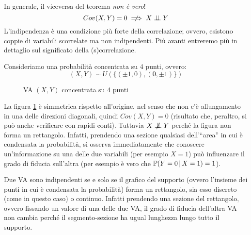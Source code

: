 \medskip
\begin{nb}
  In generale, il viceversa del teorema \emph{non è vero}!
  $$Cov(X,Y) = 0 \centernot\implies X \indep Y$$
  L'indipendenza è una condizione più forte della correlazione; ovvero, esistono coppie di variabili scorrelate ma non indipendenti. Più avanti entreremo più in dettaglio sul significato della (s)correlazione.
\end{nb}

\medskip
\begin{ese}
  Consideriamo una probabilità concentrata su 4 punti, ovvero:
  $$(X,Y) \sim U( \{ (\pm 1, 0), (0, \pm 1) \} )$$

  \begin{figure}[ht]
    \centering
    \caption{VA $(X,Y)$ concentrata su 4 punti}\label{fig-prob-concentrata}
  \end{figure}

  La figura \ref{fig-prob-concentrata} è simmetrica rispetto all'origine, nel senso che non c'è allungamento in una delle direzioni diagonali, quindi $Cov(X,Y) = 0$ (risultato che, peraltro, si può anche verificare con rapidi conti).
  Tuttavia $X \centernot\indep Y$ perché la figura non forma un rettangolo. Infatti, prendendo una sezione qualsiasi dell'``area'' in cui è condensata la probabilità, si osserva immediatamente che conoscere un'informazione su una delle due variabili (per esempio $X=1$) può influenzare il grado di fiducia sull'altra (per esempio è vero che $\mathbb P(Y = 0 \, | \, X = 1) = 1$).

  Due VA sono indipendenti se e solo se il grafico del supporto (ovvero l'insieme dei punti in cui è condensata la probabilità) forma un rettangolo, sia esso discreto (come in questo caso) o continuo. Infatti prendendo una sezione del rettangolo, ovvero fissando un valore di una delle due VA, il grado di fiducia dell'altra VA non cambia perché il segmento-sezione ha ugual lunghezza lungo tutto il supporto.
\end{ese}

